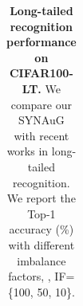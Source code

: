 \begin{table}[t]
{\begin{tabular}{@{}lcccccc}
        \bottomrule 
    \end{tabular}
    }
    \caption{\textbf{Long-tailed recognition performance on CIFAR100-LT.}
    We compare our SYNAuG with recent works in long-tailed recognition.
    We report the Top-1 accuracy (\%) with different imbalance factors, \ie, IF=\{100, 50, 10\}.
    }
    \label{tab:cifar100_lt}
\end{table}

